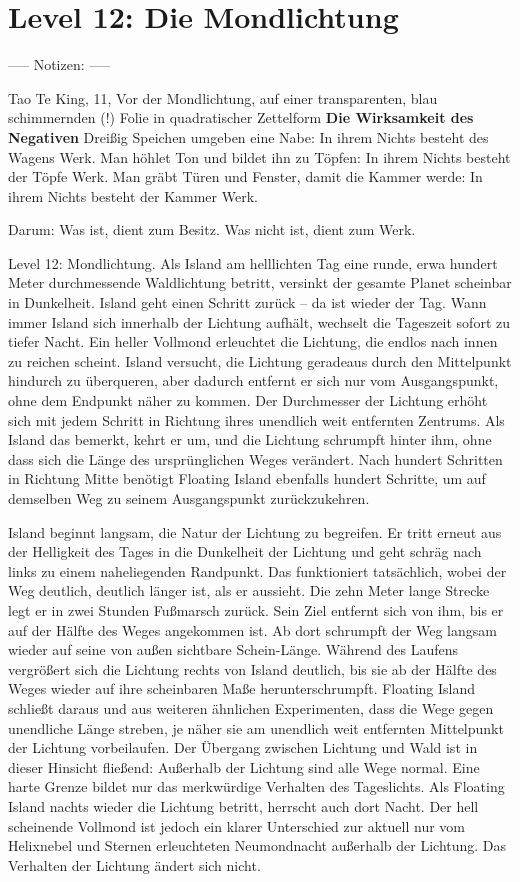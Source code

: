 \section{Level 12: Die Mondlichtung}

----- Notizen: -----

Tao Te King, 11, Vor der Mondlichtung, auf einer transparenten, blau schimmernden (!) Folie in quadratischer Zettelform
\textbf{Die Wirksamkeit des Negativen}
Dreißig Speichen umgeben eine Nabe:
In ihrem Nichts besteht des Wagens Werk.
Man höhlet Ton und bildet ihn zu Töpfen:
In ihrem Nichts besteht der Töpfe Werk.
Man gräbt Türen und Fenster, damit die Kammer werde:
In ihrem Nichts besteht der Kammer Werk.

Darum: Was ist, dient zum Besitz.
Was nicht ist, dient zum Werk.

    Level 12: Mondlichtung. Als Island am helllichten Tag eine runde, erwa hundert Meter durchmessende Waldlichtung betritt, versinkt der gesamte Planet scheinbar in Dunkelheit. Island geht einen Schritt zurück – da ist wieder der Tag. Wann immer Island sich innerhalb der Lichtung aufhält, wechselt die Tageszeit sofort zu tiefer Nacht. Ein heller Vollmond erleuchtet die Lichtung, die endlos nach innen zu reichen scheint. Island versucht, die Lichtung geradeaus durch den Mittelpunkt hindurch zu überqueren, aber dadurch entfernt er sich nur vom Ausgangspunkt, ohne dem Endpunkt näher zu kommen. Der Durchmesser der Lichtung erhöht sich mit jedem Schritt in Richtung ihres unendlich weit entfernten Zentrums. Als Island das bemerkt, kehrt er um, und die Lichtung schrumpft hinter ihm, ohne dass sich die Länge des ursprünglichen Weges verändert. Nach hundert Schritten in Richtung Mitte benötigt Floating Island ebenfalls hundert Schritte, um auf demselben Weg zu seinem Ausgangspunkt zurückzukehren.

    Island beginnt langsam, die Natur der Lichtung zu begreifen. Er tritt erneut aus der Helligkeit des Tages in die Dunkelheit der Lichtung und geht schräg nach links zu einem naheliegenden Randpunkt. Das funktioniert tatsächlich, wobei der Weg deutlich, deutlich länger ist, als er aussieht. Die zehn Meter lange Strecke legt er in zwei Stunden Fußmarsch zurück. Sein Ziel entfernt sich von ihm, bis er auf der Hälfte des Weges angekommen ist. Ab dort schrumpft der Weg langsam wieder auf seine von außen sichtbare Schein-Länge. Während des Laufens vergrößert sich die Lichtung rechts von Island deutlich, bis sie ab der Hälfte des Weges wieder auf ihre scheinbaren Maße herunterschrumpft. Floating Island schließt daraus und aus weiteren ähnlichen Experimenten, dass die Wege gegen unendliche Länge streben, je näher sie am unendlich weit entfernten Mittelpunkt der Lichtung vorbeilaufen. Der Übergang zwischen Lichtung und Wald ist in dieser Hinsicht fließend: Außerhalb der Lichtung sind alle Wege normal. Eine harte Grenze bildet nur das merkwürdige Verhalten des Tageslichts.
    Als Floating Island nachts wieder die Lichtung betritt, herrscht auch dort Nacht. Der hell scheinende Vollmond ist jedoch ein klarer Unterschied zur aktuell nur vom Helixnebel und Sternen erleuchteten Neumondnacht außerhalb der Lichtung. Das Verhalten der Lichtung ändert sich nicht.

